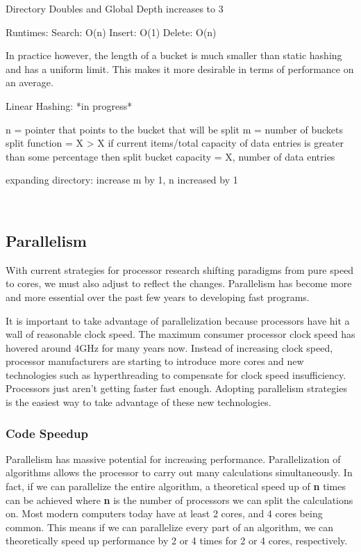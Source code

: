 \documentclass[letterpaper, 12pt]{article}
\begin{document}
Directory Doubles and Global Depth increases to 3

Runtimes:
Search: O(n)
Insert: O(1)
Delete: O(n)

In practice however, the length of a bucket is much smaller than static hashing and has a uniform limit. This makes it more desirable
in terms of performance on an average.

Linear Hashing: *in progress*

n = pointer that points to the bucket that will be split
m = number of buckets
split function = X > X if current items/total capacity of data entries is greater than some percentage then split
bucket capacity = X, number of data entries

expanding directory:
increase m by 1, n increased by 1

\
\newpage

\subsection{Parallelism}
With current strategies for processor research shifting paradigms from pure speed to cores, 
we must also adjust to reflect the changes. Parallelism has become more and more essential 
over the past few years to developing fast programs.

\par\vspace{\baselineskip}

It is important to take advantage of parallelization because processors have hit a wall of 
reasonable clock speed\citep{processorspeed}. The maximum consumer processor clock speed has 
hovered around 4GHz for many years now. Instead of increasing clock speed, processor 
manufacturers are starting to introduce more cores and new technologies such as hyperthreading 
to compensate for clock speed insufficiency. Processors just aren't getting faster fast enough. 
Adopting parallelism strategies is the easiest way to take advantage of these new technologies.

\subsubsection{Code Speedup}
Parallelism has massive potential for increasing performance. Parallelization of algorithms 
allows the processor to carry out many calculations simultaneously. In fact, if we can 
parallelize the entire algorithm, a theoretical speed up of {\bfseries n} times can be 
achieved where {\bfseries n} is the number of processors we can split the calculations on. 
Most modern computers today have at least 2 cores, and 4 cores being common. This means 
if we can parallelize every part of an algorithm, we can theoretically speed up performance 
by 2 or 4 times for 2 or 4 cores, respectively. 
\end{document}

